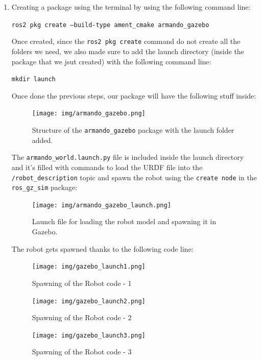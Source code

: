 \documentclass{article}
\begin{document}
\begin{enumerate}
    \item Creating a package using the terminal by using the following command line:
    \begin{center}
        \texttt{ros2 pkg create --build-type \lstinline{ament_cmake armando_gazebo}}
    \end{center}

\noindent Once created, since the \lstinline{ros2 pkg create} command do not create all the folders we need, we also made sure to add the launch directory (inside the package that we jsut created) with the following command line:

  \begin{center}
        \texttt{mkdir launch}
    \end{center}

\noindent Once done the previous steps, our package will have the following stuff inside:
    \begin{figure}[H]
    \centering
    \texttt{[image: img/armando\_gazebo.png]}
    \caption{Structure of the \texttt{armando\_gazebo} package with the launch folder added.}
    \label{fig:armando_gazebo}
    \end{figure}
    
\noindent The \lstinline{armando_world.launch.py} file is included inside the launch directory and it's filled with commands to load the URDF file into the \lstinline{/robot_description} topic and spawn the robot using the \lstinline{create node} in the \lstinline{ros_gz_sim} package:

    \begin{figure}[H]
    \centering
    \texttt{[image: img/armando\_gazebo\_launch.png]}
    \caption{Launch file for loading the robot model and spawning it in Gazebo.}
    \label{fig:armando_gazebo_launch}
    \end{figure}
    
\noindent The robot gets spawned thanks to the following code line:

    \begin{figure}[H]
        \centering
        \texttt{[image: img/gazebo\_launch1.png]}
        \label{fig:gazebo_launch1}
        \caption{Spawning of the Robot code - 1}
        \label{fig:spawning_robot_code_1}
    \end{figure}
        \begin{figure}[H]
        \centering
        \texttt{[image: img/gazebo\_launch2.png]}
        \caption{Spawning of the Robot code - 2}
        \label{fig:spawning_robot_code_2}
    \end{figure}
        \begin{figure}[H]
        \centering
        \texttt{[image: img/gazebo\_launch3.png]}
        \caption{Spawning of the Robot code - 3}
        \label{fig:spawning_robot_code_3}
    \end{figure}


\end{enumerate}
\end{document}
